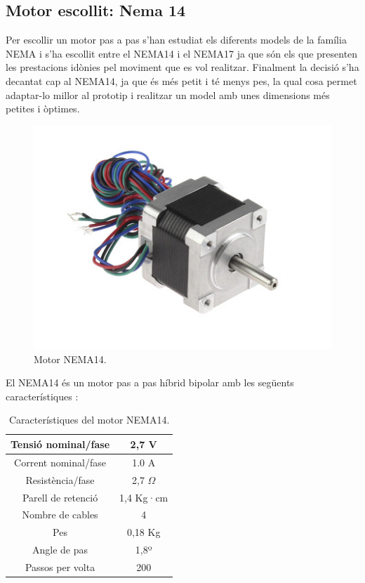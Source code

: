 \subsection{Motor escollit: Nema 14}
Per escollir un motor pas a pas s'han estudiat els diferents models de la família NEMA i s'ha escollit entre el NEMA14 i el NEMA17 ja que són els que presenten les prestacions idònies pel moviment que es vol realitzar. Finalment la decisió s'ha decantat cap al NEMA14, ja que és més petit i té menys pes, la qual cosa permet adaptar-lo millor al prototip i realitzar un model amb unes dimensions més petites i òptimes.

\begin{figure}[H]
	\centering
	\includegraphics[scale=2]{NEMA14}
	\caption{Motor NEMA14.}
	\label{fig:NEMA14}
\end{figure}

El NEMA14 és un motor pas a pas híbrid bipolar amb les següents característiques \cite{thingibox2017}: 

\begin{table}[htbp]
	\begin{center}
		\begin{tabular}{|c|c|}
			\hline
			
			Tensió nominal/fase & 2,7 V  \\ \hline
			Corrent nominal/fase & 1.0 A  \\ \hline
			Resistència/fase & 2,7 $\Omega$  \\ \hline
			Parell de retenció & 1,4 Kg·cm  \\ \hline
			Nombre de cables & 4  \\ \hline
			Pes & 0,18 Kg  \\ \hline
			Angle de pas & 1,8º  \\ \hline
			Passos per volta & 200  \\ \hline
		\end{tabular}
		\caption{Característiques del motor NEMA14.}
		\label{tabla:NEMA14}
	\end{center}
\end{table}



